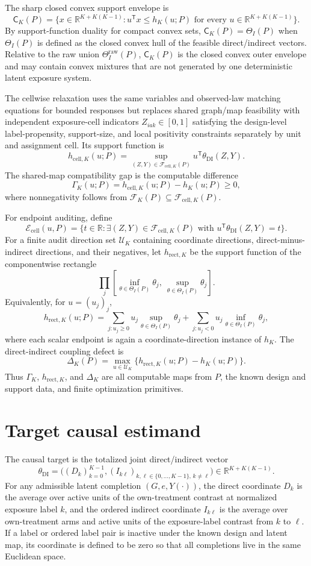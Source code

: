 \documentclass[11pt]{article}
\newcommand{\transpose}{\mathsf{T}}
\theoremstyle{definition}
\theoremstyle{plain}
\theoremstyle{remark}
\begin{document}
The sharp closed convex support envelope is
\[
\mathsf C_K(P)=\{x\in\mathbb R^{K+K(K-1)}:u^\transpose x\le h_K(u;P)\text{ for every }u\in\mathbb R^{K+K(K-1)}\}.
\]
By support-function duality for compact convex sets, \(\mathsf C_K(P)=\Theta_I(P)\) when \(\Theta_I(P)\) is defined as the closed convex hull of the feasible direct/indirect vectors.  Relative to the raw union \(\Theta_I^{\mathrm{raw}}(P)\), \(\mathsf C_K(P)\) is the closed convex outer envelope and may contain convex mixtures that are not generated by one deterministic latent exposure system.

The cellwise relaxation uses the same variables and observed-law matching equations for bounded responses but replaces shared graph/map feasibility with independent exposure-cell indicators \(Z_{iak}\in[0,1]\) satisfying the design-level label-propensity, support-size, and local positivity constraints separately by unit and assignment cell.  Its support function is
\[
h_{\mathrm{cell},K}(u;P)=
\sup_{(Z,Y)\in\mathcal F_{\mathrm{cell},K}(P)}
u^\transpose\theta_{\mathrm{DI}}(Z,Y).
\]
The shared-map compatibility gap is the computable difference
\[
\Gamma_K(u;P)=h_{\mathrm{cell},K}(u;P)-h_K(u;P)\ge0,
\]
where nonnegativity follows from \(\mathcal F_K(P)\subseteq\mathcal F_{\mathrm{cell},K}(P)\).

For endpoint auditing, define
\[
\mathcal E_{\mathrm{cell}}(u,P)=
\{t\in\mathbb R:\exists (Z,Y)\in\mathcal F_{\mathrm{cell},K}(P)
\text{ with }u^\transpose\theta_{\mathrm{DI}}(Z,Y)=t\}.
\]
For a finite audit direction set \(\mathcal U_K\) containing coordinate directions, direct-minus-indirect directions, and their negatives, let \(h_{\mathrm{rect},K}\) be the support function of the componentwise rectangle
\[
\prod_j [\inf_{\theta\in\Theta_I(P)}\theta_j,\ \sup_{\theta\in\Theta_I(P)}\theta_j].
\]
Equivalently, for \(u=(u_j)_j\),
\[
h_{\mathrm{rect},K}(u;P)=
\sum_{j:u_j\ge0}u_j\sup_{\theta\in\Theta_I(P)}\theta_j
+\sum_{j:u_j<0}u_j\inf_{\theta\in\Theta_I(P)}\theta_j,
\]
where each scalar endpoint is again a coordinate-direction instance of \(h_K\).  The direct-indirect coupling defect is
\[
\Delta_K(P)=
\max_{u\in\mathcal U_K}
\{h_{\mathrm{rect},K}(u;P)-h_K(u;P)\}.
\]
Thus \(\Gamma_K\), \(h_{\mathrm{rect},K}\), and \(\Delta_K\) are all computable maps from \(P\), the known design and support data, and finite optimization primitives.

\section{Target causal estimand}
The causal target is the totalized joint direct/indirect vector
\[
\theta_{\mathrm{DI}}=
\bigl((D_k)_{k=0}^{K-1},(I_{k\ell})_{k,\ell\in\{0,\ldots,K-1\},\,k\ne\ell}\bigr)
\in\mathbb R^{K+K(K-1)}.
\]
For any admissible latent completion \((G,e,Y(\cdot))\), the direct coordinate \(D_k\) is the average over active units of the own-treatment contrast at normalized exposure label \(k\), and the ordered indirect coordinate \(I_{k\ell}\) is the average over own-treatment arms and active units of the exposure-label contrast from \(k\) to \(\ell\).  If a label or ordered label pair is inactive under the known design and latent map, its coordinate is defined to be zero so that all completions live in the same Euclidean space.
\end{document}
